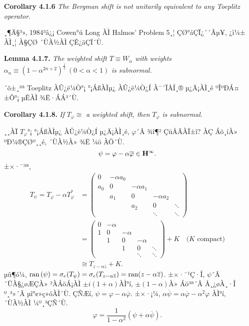 \documentclass[12pt,a4paper,2sided]{article}
\begin{document}
{\bf Corollary 4.1.6} {\sl The Bergman shift is not unitarily
equivalent to any Toeplitz operator.} \vspace{.2 cm}

\vspace{.2 cm}

¸¶Ä§³», 1984³â¿¡ Cowen°ú Long \cite{CoL}ÀÌ Halmos' Problem 5¸¦
ÇØ°áÇÏ¿´´Âµ¥, ¿ì¼± ÀÌ¸¦ À§ÇØ ´ÙÀ½ÀÌ ÇÊ¿äÇÏ´Ù.

\vspace{.2 cm} {\bf Lemma 4.1.7.} {\sl The weighted shift $T\equiv
W_{\alpha}$ with weights $\alpha_n\equiv
(1-\alpha^{2n+2})^{\frac{1}{2}}\ (0<\alpha <1)$ is subnormal.}

\vspace{.2 cm} ´õ±¸³ª Toeplitz ÀÛ¿ë¼Ò°¡ °¡ÁßÀÌµ¿ ÀÛ¿ë¼Ò¿Í À¯´ÏÅÍ¸®
µ¿Ä¡ÀÌ¸é ºÎºÐÁ¤±Ô°¡ µÊÀÌ ¾Ë·ÁÁ³´Ù.



\newpage{}

\vspace{.8 cm}

{\bf Corollary 4.1.8.} {\sl If $T_{\varphi} \cong$ a weighted shift,
then $T_\varphi$ is subnormal.} \vspace{.2 cm}

¸¸ÀÏ  $T_\varphi$°¡ °¡ÁßÀÌµ¿ ÀÛ¿ë¼Ò¿Í µ¿Ä¡ÀÌ¸é,
$\varphi$´Â ¾î¶² ÇüÅÂÀÏ±î?
\cite[Theorem 3.7]{Sun}ÀÇ Áõ¸íÀ» ºÐ¼®ÇØº¸¸é,
´ÙÀ½À» ¾Ë ¼ö ÀÖ´Ù.
$$
\psi=\varphi -\alpha\overline{\varphi}\in {\bold H}^{\infty}.
$$
±×·¯³ª,
\begin{align*}
T_\psi =T_\varphi -\alpha T_{\varphi}^* &=
{\begin{pmatrix}
0 &-\alpha a_0\\
a_0&0&-\alpha a_1\\
&a_1&0&-\alpha a_2\\
&&a_2&0&\ddots\\
&&&\ddots&\ddots
 \end{pmatrix}}\\
&=\begin{pmatrix}
0 &-\alpha\\
1&0&-\alpha\\
&1&0&-\alpha\\
&&1&0&\ddots\\
 &&&\ddots&\ddots
\end{pmatrix} + K\quad \mbox{($K$ compact)}\\
&\cong T_{z-\alpha\overline{z}}+K.
\end{align*}
µû¶ó¼­,
$\mbox{ran}\,(\psi)=\sigma_{e}(T_{\psi})
=\sigma_{e}(T_{z-\alpha\overline{z}})={\rm ran}(z-\alpha\overline{z})$.
±×·¯¹Ç·Î, $\psi$´Â ´ÜÀ§¿øÆÇÀ» ²ÀÁöÁ¡ÀÌ  $\pm i(1+\alpha)$ÀÌ°í,  $\pm(1-\alpha)$À»
Áö³ª´Â Å¸¿øÀ¸·Î º¸³»´Â µî°¢»ç»óÀÌ´Ù.
ÇÑÆí, $\psi=\varphi -\alpha\overline{\varphi}$.
±×·¡¼­,
$\alpha\overline{\psi}=\alpha\overline{\varphi} -\alpha^2\varphi$
ÀÌ°í, ´ÙÀ½ÀÌ ¼º¸³ÇÑ´Ù.
$$
\varphi=\frac{1}{1-\alpha^2}(\psi +\alpha\overline{\psi}).
$$
\end{document}
